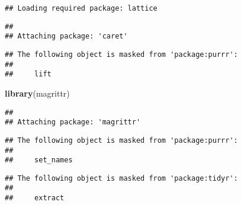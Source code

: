 \documentclass[]{article}
\newenvironment{Shaded}{\begin{snugshade}}{\end{snugshade}}
\newcommand{\CommentTok}[1]{\textcolor[rgb]{0.56,0.35,0.01}{\textit{#1}}}
\newcommand{\DataTypeTok}[1]{\textcolor[rgb]{0.13,0.29,0.53}{#1}}
\newcommand{\KeywordTok}[1]{\textcolor[rgb]{0.13,0.29,0.53}{\textbf{#1}}}
\newcommand{\NormalTok}[1]{#1}
\newcommand{\OperatorTok}[1]{\textcolor[rgb]{0.81,0.36,0.00}{\textbf{#1}}}
\newcommand{\OtherTok}[1]{\textcolor[rgb]{0.56,0.35,0.01}{#1}}
\newcommand{\StringTok}[1]{\textcolor[rgb]{0.31,0.60,0.02}{#1}}
\begin{document}
\begin{verbatim}
## Loading required package: lattice
\end{verbatim}

\begin{verbatim}
## 
## Attaching package: 'caret'
\end{verbatim}

\begin{verbatim}
## The following object is masked from 'package:purrr':
## 
##     lift
\end{verbatim}

\begin{Shaded}
\begin{Highlighting}[]
\KeywordTok{library}\NormalTok{(magrittr)}
\end{Highlighting}
\end{Shaded}

\begin{verbatim}
## 
## Attaching package: 'magrittr'
\end{verbatim}

\begin{verbatim}
## The following object is masked from 'package:purrr':
## 
##     set_names
\end{verbatim}

\begin{verbatim}
## The following object is masked from 'package:tidyr':
## 
##     extract
\end{verbatim}

\begin{Shaded}
\end{Shaded}
\end{document}
